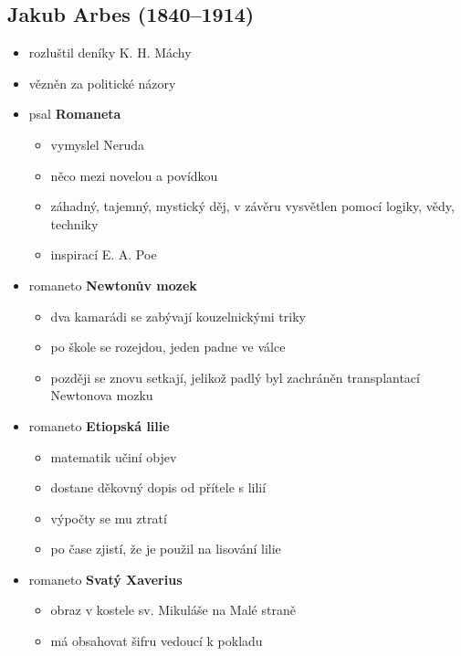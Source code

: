 \subsection{Jakub Arbes (1840--1914)}
\begin{itemize}
\item rozluštil deníky K. H. Máchy
\item vězněn za politické názory
\item psal \textbf{Romaneta}
	\begin{itemize}
	\item vymyslel Neruda
	\item něco mezi novelou a povídkou
	\item záhadný, tajemný, mystický děj, v závěru vysvětlen pomocí logiky, vědy, techniky
	\item inspirací E. A. Poe
	\end{itemize}
\item romaneto \textbf{Newtonův mozek}
	\begin{itemize}
	\item dva kamarádi se zabývají kouzelnickými triky
	\item po škole se rozejdou, jeden padne ve válce
	\item později se znovu setkají, jelikož padlý byl zachráněn transplantací Newtonova mozku
	\end{itemize}
\item romaneto \textbf{Etiopská lilie}
	\begin{itemize}
	\item matematik učiní objev
	\item dostane děkovný dopis od přítele s lilií
	\item výpočty se mu ztratí
	\item po čase zjistí, že je použil na lisování lilie
	\end{itemize}
\item romaneto \textbf{Svatý Xaverius}
	\begin{itemize}
	\item obraz v kostele sv. Mikuláše na Malé straně
	\item má obsahovat šifru vedoucí k pokladu
	\end{itemize}
\end{itemize}


